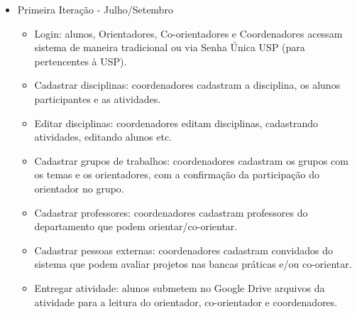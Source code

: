 \begin{itemize}
    \item Primeira Iteração - Julho/Setembro
    \begin{itemize}
        \item Login: alunos, Orientadores, Co-orientadores e Coordenadores acessam sistema de maneira tradicional ou via Senha Única USP (para pertencentes à USP).
        \item Cadastrar disciplinas: coordenadores cadastram a disciplina, os alunos participantes e as atividades.
        \item Editar disciplinas: coordenadores editam disciplinas, cadastrando atividades, editando alunos etc.
        \item Cadastrar grupos de trabalhos: coordenadores cadastram os grupos com os temas e os orientadores, com a confirmação da participação do orientador no grupo.
        \item Cadastrar professores: coordenadores cadastram professores do departamento que podem orientar/co-orientar.
        \item Cadastrar pessoas externas: coordenadores cadastram convidados do sistema que podem avaliar projetos nas bancas práticas e/ou co-orientar.
        \item Entregar atividade: alunos submetem no Google Drive arquivos da atividade para a leitura do orientador, co-orientador e coordenadores.
    \end{itemize}
\end{itemize}


